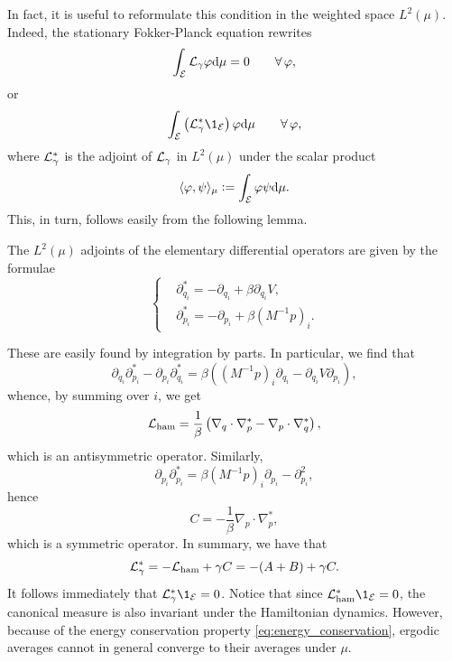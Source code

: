     In fact, it is useful to reformulate this condition in the weighted space $L^{2}(\mu)$. Indeed, the stationary Fokker-Planck equation rewrites
    $$\int_{\mathcal E}\mathcal{L}_\gamma \varphi \mathrm{d} \mu=0\qquad \forall\,\varphi,$$
    or
    $$\int_{\mathcal E}\left(\cL_\gamma^* \1_{\mathcal E}\right)\varphi \dif \mu\qquad\forall\,\varphi,$$
    where $\mathcal{L}_\gamma^*$ is the adjoint of $\mathcal{L}_\gamma$ in $L^2(\mu)$ under the scalar product
    $$\langle \varphi,\psi \rangle_\mu\mathrel{\mathop:}= \int_{\mathcal E}\varphi \psi \mathrm{d} \mu.$$
    This, in turn, follows easily from the following lemma.
    \begin{lemma}
        \label{lemma:star_adjoints_langevin}
        The $L^2(\mu)$ adjoints of the elementary differential operators are given by the formulae
        \begin{equation}
            \label{eq:star_adjoints_langevin}
            \left\{\begin{aligned}
            &\partial_{q_i}^*=-\partial_{q_i}+\beta\partial_{q_i}V,\\
            &\partial_{p_i}^*=-\partial_{p_i}+\beta\left(M^{-1}p\right)_i.
            \end{aligned}\right.
        \end{equation}
    \end{lemma}
    These are easily found by integration by parts. In particular, we find that 
    $$\partial_{q_i}\partial_{p_i}^*-\partial_{p_i}\partial_{q_i}^*=\beta\left((M^{-1}p)_i\partial_{q_i}-\partial_{q_i}V\partial_{p_i}\right),$$
    whence, by summing over $i$, we get 
    \begin{equation}
        \label{eq:L_ham_antisymmetric}
        \mathcal{L}_{\rm ham}=\frac1\beta\left(\nabla_q\cdot\nabla_p^*-\nabla_p\cdot\nabla_q^*\right),
    \end{equation}
    which is an antisymmetric operator. Similarly,
    $$\partial_{p_i}\partial_{p_i}^*=\beta(M^{-1}p)_i\partial_{p_i}-\partial_{p_i}^2,$$
    hence
    \begin{equation}
        \label{eq:C_symmetric}
        C=-\frac{1}\beta\nabla_p\cdot\nabla_p^*,
    \end{equation}
    which is a symmetric operator. In summary, we have that 
    \begin{equation}
        \label{eq:L_star}
        \mathcal{L}_\gamma^*=-\mathcal{L}_{\rm ham}+\gamma C=-(A+B)+\gamma C.
    \end{equation}
    It follows immediately that $\cL_\gamma^*\1_{\mathcal E}=0$. Notice that since $\cLham^*\1_{\mathcal E}=0$, the canonical measure is also invariant under the Hamiltonian dynamics. However, because of the energy conservation property \eqref{eq:energy_conservation}, ergodic averages cannot in general converge to their averages under $\mu$.

